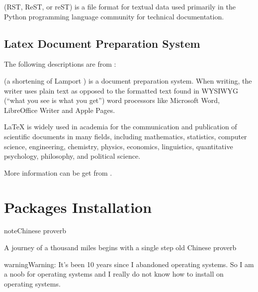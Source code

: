 \documentclass[letterpaper,12pt,english]{sphinxmanual}
\begin{document}
 (RST, ReST, or reST) is a file format for textual data used primarily in the Python programming language community for technical documentation.


\section{Latex Document Preparation System}
\label{\detokenize{intro:latex-document-preparation-system}}
The following descriptions are from :

 (a shortening of Lamport ) is a document preparation system. When writing, the writer uses plain text as opposed to the formatted text found in WYSIWYG (“what you see is what you get”) word processors like Microsoft Word, LibreOffice Writer and Apple Pages.

LaTeX is widely used in academia for the communication and publication of scientific documents in many fields, including mathematics, statistics, computer science, engineering, chemistry, physics, economics, linguistics, quantitative psychology, philosophy, and political science.

More information can be get from  .


\chapter{Packages Installation}
\label{\detokenize{pkgs:packages-installation}}\label{\detokenize{pkgs:pkgs}}\label{\detokenize{pkgs::doc}}
\begin{sphinxadmonition}{note}{Chinese proverb}

A journey of a thousand miles begins with a single step \textendash{} old Chinese proverb
\end{sphinxadmonition}

\begin{sphinxadmonition}{warning}{Warning:}
It’s been 10 years since I abandoned  operating systems. So I am a noob for  operating systems and I really do not know how to install  on  operating systems.
\end{sphinxadmonition}
\end{document}
